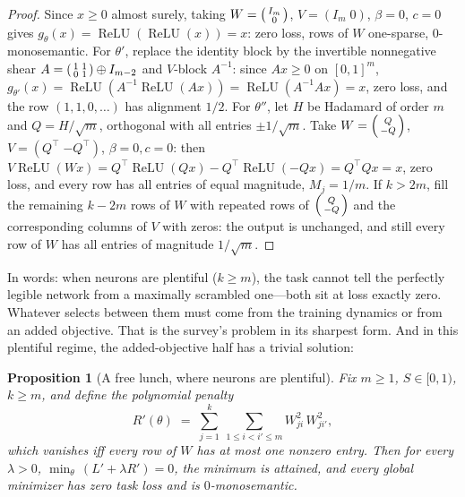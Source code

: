 \documentclass[11pt]{amsart}
\theoremstyle{plain}
\newtheorem{proposition}[theorem]{Proposition}
\theoremstyle{definition}
\DeclareMathOperator{\relu}{ReLU}
\begin{document}
\begin{proof}
Since $x\ge0$ almost surely, taking $W=\begin{psmallmatrix}I_m\\0\end{psmallmatrix}$, $V=(I_m\;0)$, $\beta=0$, $c=0$ gives $g_\theta(x)=\relu(\relu(x))=x$: zero loss, rows of $W$ one-sparse, $0$-monosemantic. For $\theta'$, replace the identity block by the invertible nonnegative shear $A=\begin{psmallmatrix}1&1\\0&1\end{psmallmatrix}\oplus I_{m-2}$ and $V$-block $A^{-1}$: since $Ax\ge0$ on $[0,1]^m$, $g_{\theta'}(x)=\relu(A^{-1}\relu(Ax))=\relu(A^{-1}Ax)=x$, zero loss, and the row $(1,1,0,\dots)$ has alignment $1/2$. For $\theta''$, let $H$ be Hadamard of order $m$ and $Q=H/\sqrt m$, orthogonal with all entries $\pm1/\sqrt m$. Take $W=\begin{psmallmatrix}Q\\-Q\end{psmallmatrix}$, $V=(Q^{\top}\;{-Q^{\top}})$, $\beta=0,c=0$: then $V\relu(Wx)=Q^\top\relu(Qx)-Q^\top\relu(-Qx)=Q^{\top}Qx=x$, zero loss, and every row has all entries of equal magnitude, $M_j=1/m$. If $k>2m$, fill the remaining $k-2m$ rows of $W$ with repeated rows of $\begin{psmallmatrix}Q\\-Q\end{psmallmatrix}$ and the corresponding columns of $V$ with zeros: the output is unchanged, and still every row of $W$ has all entries of magnitude $1/\sqrt m$.
\end{proof}

In words: when neurons are plentiful ($k\ge m$), the task cannot tell the perfectly legible network from a maximally scrambled one---both sit at loss exactly zero. Whatever selects between them must come from the training dynamics or from an added objective. That is the survey's problem in its sharpest form. And in this plentiful regime, the added-objective half has a trivial solution:

\begin{proposition}[A free lunch, where neurons are plentiful]\label{prop:freelunch}
Fix $m\ge1$, $S\in[0,1)$, $k\ge m$, and define the polynomial penalty
\[
R'(\theta) \;=\; \sum_{j=1}^{k}\ \sum_{1\le i<i'\le m} W_{ji}^2\,W_{ji'}^2 ,
\]
which vanishes iff every row of $W$ has at most one nonzero entry. Then for every $\lambda>0$, $\min_\theta\, (L'+\lambda R')=0$, the minimum is attained, and \emph{every} global minimizer has zero task loss and is $0$-monosemantic.
\end{proposition}
\end{document}
